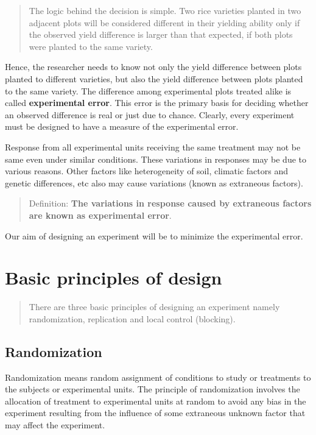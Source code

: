 \documentclass[
]{book}
\begin{document}
\begin{quote}
The logic behind the decision is simple. Two rice varieties planted in two adjacent plots will be considered different in their yielding ability only if the observed yield difference is larger than that expected, if both plots were planted to the same variety.
\end{quote}

Hence, the researcher needs to know not only the yield difference between plots planted to different varieties, but also the yield difference between plots planted to the same variety. The difference among experimental plots treated alike is called \textbf{experimental error}. This error is the primary basis for deciding whether an observed difference is real or just due to chance. Clearly, every experiment must be designed to have a measure of the experimental error.

Response from all experimental units receiving the same treatment may not be same even under similar conditions. These variations in responses may be due to various reasons. Other factors like heterogeneity of soil, climatic factors and genetic differences, etc also may cause variations (known as extraneous factors).

\begin{quote}
Definition: \textbf{The variations in response caused by extraneous factors are known as experimental error}.
\end{quote}

Our aim of designing an experiment will be to minimize the experimental error.

\hypertarget{basic-principles-of-design}{%
\section{Basic principles of design}\label{basic-principles-of-design}}

\begin{quote}
There are three basic principles of designing an experiment namely randomization, replication and local control (blocking).
\end{quote}

\hypertarget{rand}{%
\subsection{\texorpdfstring{\textbf{Randomization}}{Randomization}}\label{rand}}

Randomization means random assignment of conditions to study or treatments to the subjects or experimental units. The principle of randomization involves the allocation of treatment to experimental units at random to avoid any bias in the experiment resulting from the influence of some extraneous unknown factor that may affect the experiment.
\end{document}
